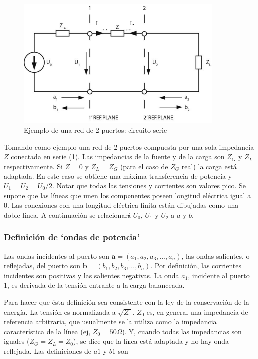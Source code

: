 \begin{figure}[H]
 \centering
 \includegraphics[width=10cm]{gfx/sParameters1.png}
 \caption{Ejemplo de una red de 2 puertos: circuito serie}
 \label{fig:esquema_serie}
\end{figure}

Tomando como ejemplo una red de 2 puertos compuesta por una sola impedancia $Z$ conectada en serie (\ref{fig:esquema_serie}).
Las impedancias de la fuente y de la carga son $Z_G$ y $Z_L$ respectivamente. Si $Z=0$ y $Z_L = Z_G$ (para el caso de $Z_G$ real)
la carga está adaptada. En este caso se obtiene una máxima transferencia de potencia y $U_1 = U_2 = U_0/2$. Notar que todas las
tensiones y corrientes son valores pico. Se supone que las líneas que unen los componentes poseen longitud eléctrica igual a 0.
Las conexiones con una longitud eléctrica finita están dibujadas como una doble línea. A continuación se relacionará $U_0$, $U_1$
y $U_2$ a $a$ y $b$.


\subsubsection{Definición de \enquote*{ondas de potencia}}

Las ondas incidentes al puerto son $\textbf{a}=(a_1, a_2, a_3, ..., a_n)$, las ondas salientes, o reflejadas, del puerto son
$\textbf{b}=(b_1, b_2, b_3, ..., b_n)$. Por definición, las corrientes incidentes son positivas y las salientes negativas. La
onda $a_1$, incidente al puerto 1, es derivada de la tensión entrante a la carga balanceada.

Para hacer que ésta definición sea consistente con la ley de la conservación de la energía. La tensión es normalizada a $\sqrt{Z_0}$.
$Z_0$ es, en general una impedancia de referencia arbitraria, que usualmente se la utiliza como la impedancia característica de la
línea (ej, $Z_0 = 50 \Omega$). Y, cuando todas las impedancias son iguales ($Z_G = Z_L = Z_0$), se dice que la línea está adaptada
y no hay onda reflejada. Las definiciones de $a1$ y $b1$ son:

